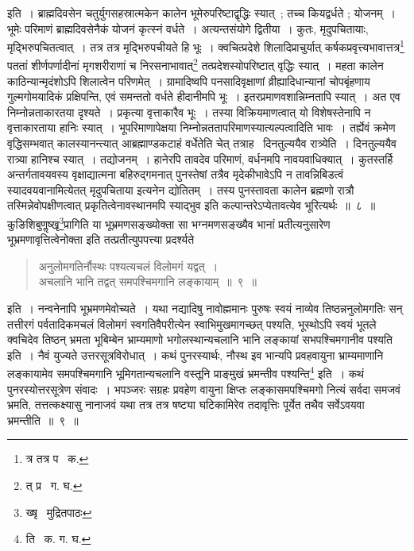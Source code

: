 \documentclass[11pt, openany]{book}
\begin{document}
\indent इति~। ब्राह्मदिवसेन चतुर्युगसहस्रात्मकेन कालेन भूमेरुपरिष्टाद्वृद्धिः स्यात्~; तच्च कियद्वर्धते ; योजनम्~। 
भूमेः परिमाणं ब्राह्मदिवसेनैकं योजनं कृत्स्नं वर्धते~। अत्यन्तसंयोगे द्वितीया~। कुतः, मृदुपचितायाः, 
मृद्भिरुपचितत्वात्~। तत्र तत्र मृद्भिरुपचीयते हि भूः~। क्वचित्प्रदेशे शिलादिप्राचुर्यात् कर्षकप्रवृत्त्यभावात्तत्र\renewcommand{\thefootnote}{१}\footnote{त्र तत्र प \textendash\ क.} पततां शीर्णपर्णादीनां मृगशरीराणां च निरसनाभावात्\renewcommand{\thefootnote}{२}\footnote{त् प्र \textendash\ ग. घ.} तत्प्रदेशस्योपरिष्टात् वृद्धिः स्यात्~। महता कालेन काठिन्यान्मृदंशोऽपि शिलात्वेन परिणमेत्~। ग्रामादिष्वपि पनसादिवृक्षाणां व्रीह्यादिधान्यानां चोपबृंहणाय गुल्मगोमयादिकं प्रक्षिपन्ति, एवं समन्ततो वर्धते हीदानीमपि भूः~। इतरप्रमाणवशान्निम्नतापि स्यात्~। अत एव निम्नोन्नताकारतया दृश्यते~। प्रकृत्या वृत्ताकारैव भूः~। तस्या विक्रियमाणत्वात् यो विशेषस्तेनापि न वृत्ताकारताया हानिः स्यात्~। भूपरिमाणापेक्षया निम्नोन्नततापरिमाणस्यात्यल्पत्वादिति भावः~। तर्ह्येवं क्रमेण वृद्धिसम्भवात् कालस्यानन्त्यात् आब्रह्माण्डकटाहं वर्धेतेति चेत् तत्राह \textendash\ दिनतुल्ययैव रात्र्येति~। दिनतुल्ययैव रात्र्या हानिश्च स्यात्~। तद्योजनम्~। हानेरपि तावदेव परिमाणं, वर्धनमपि नावयवाधिक्यात्~। कुतस्तर्हि अन्तर्गतावयवस्य वृक्षाद्यात्मना बहिरुद्गमनात् 
पुनस्तेषां तत्रैव मृदेकीभावेऽपि न तावन्निबिडत्वं स्यादवयवानामित्येतत् मृदुपचिताया इत्यनेन द्योतितम्~। तस्य पुनस्तावता कालेन ब्रह्मणो रात्रौ तस्मिन्नेवोपक्षीणत्वात् प्रकृतित्वेनावस्थानमपि स्याद्भुव इति कल्पान्तरेऽप्येतावत्येव भूरित्यर्थः~॥~८~॥ \\

\indent कुङिशिबुणॢष्खृ\renewcommand{\thefootnote}{+}\footnote{ख्षृ \textendash\ मुद्रितपाठः}प्रागिति या भूभ्रमणसङ्ख्योक्ता सा भग्नमणसङ्ख्यैव भानां प्रतीत्यनुसारेण भूभ्रमणावृत्तित्वेनोक्ता इति तत्प्रतीत्युपपत्त्या प्रदर्श्यते\textendash  

\newpage

\begin{quote}
{\ab अनुलोमगतिर्नौस्थः पश्यत्यचलं विलोमगं यद्वत्~। \\
 अचलानि भानि तद्वत् समपश्चिमगानि लङ्कायाम्~॥~९~॥} 
\end{quote}

\indent इति~। नन्वनेनापि भूभ्रमणमेवोच्यते~। यथा नद्यादिषु नावोह्ममानः पुरुषः स्वयं नाव्येव तिष्ठन्ननुलोमगतिः सन् तत्तीरगं पर्वतादिकमचलं विलोमगं स्वगतिवैपरीत्येन स्वाभिमुखमागच्छत् पश्यति, भूस्थोऽपि स्वयं भूतले क्वचिदेव तिष्ठन् भ्रमता भूबिम्बेन भ्राम्यमाणो भगोलस्थान्यचलानि भानि लङ्कायां सभपश्चिमगानीव पश्यति इति~। नैवं युज्यते उत्तरसूत्रविरोधात्~। कथं पुनरस्यार्थः, नौस्थ इव भान्यपि 
प्रवहवायुना भ्राम्यमाणानि लङ्कायामेव समपश्चिमगानि भूमिगतान्यचलानि वस्तूनि प्राङ्मुखं भ्रमन्तीव पश्यन्ति\renewcommand{\thefootnote}{१}\footnote{ति \textendash\ क. ग. घ.} इति~। कथं पुनरस्योत्तरसूत्रेण संवादः~। भपञ्जरः सग्रहः प्रवहेण वायुना क्षिप्तः लङ्कासमपश्चिमगो नित्यं सर्वदा समजवं भ्रमति, तत्तत्कक्ष्यासु नानाजवं यथा तत्र तत्र षष्ट्या घटिकामिरेव तदावृत्तिः पूर्येत तथैव सर्वेऽवयवा भ्रमन्तीति~॥~९~॥\\ 
\end{document}
